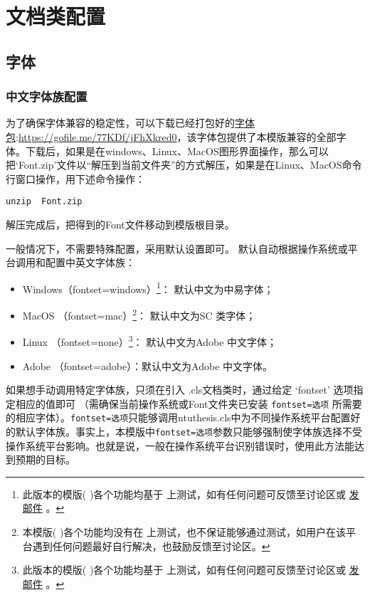 \chapter{\projectname 文档类配置}\label{cha:clscfg}




\section{字体}\label{sec:fontset}
\subsection{中文字体族配置}
为了确保字体兼容的稳定性，可以下载已经打包好的\href{https://gofile.me/77KDf/jFhXkred0}{字体包}:\url{https://gofile.me/77KDf/jFhXkred0}，该字体包提供了本模版兼容的全部字体。下载后，如果是在windows、Linux、MacOS图形界面操作，那么可以把‘Font.zip’文件以“解压到当前文件夹”的方式解压，如果是在Linux、MacOS命令行窗口操作，用下述命令操作：
\begin{lstlisting}
unzip  Font.zip
\end{lstlisting}
解压完成后，把得到的Font文件移动到模版根目录。


 一般情况下，不需要特殊配置，采用默认设置即可。
\projectname 默认自动根据操作系统或平台调用和配置中英文字体族：
\begin{itemize}
    \item Windows（fontset=windows）\footnote{此版本的模版( \project )各个功能均基于 \projectwindows 上测试，如有任何问题可反馈至讨论区或 \href{mailto:\projectemail }{发邮件} 。}： 默认中文为中易字体；
    \item MacOS （fontset=mac）\footnote{本模版( \project )各个功能均没有在 \projectmacos 上测试，也不保证能够通过测试，如用户在该平台遇到任何问题最好自行解决，也鼓励反馈至讨论区。}： 默认中文为SC 类字体；
    \item Linux （fontset=none）\footnote{此版本的模版( \project )各个功能均基于 \projectlinux 上测试，如有任何问题可反馈至讨论区或 \href{mailto:\projectemail }{发邮件} 。}： 默认中文为Adobe 中文字体；
    \item Adobe （fontset=adobe）：默认中文为Adobe 中文字体。
\end{itemize}
如果想手动调用特定字体族，只须在引入 \projectname.cls文档类时，通过给定 ‘fontset’ 选项指定相应的值即可 （需确保当前操作系统或Font文件夹已安装 \texttt{fontset=选项} 所需要的相应字体）。\texttt{fontset=选项}只能够调用ntuthesis.cls中为不同操作系统平台配置好的默认字体族。事实上，本模版中\texttt{fontset=选项}参数只能够强制使字体族选择不受操作系统平台影响。也就是说，一般在操作系统平台识别错误时，使用此方法能达到预期的目标。

